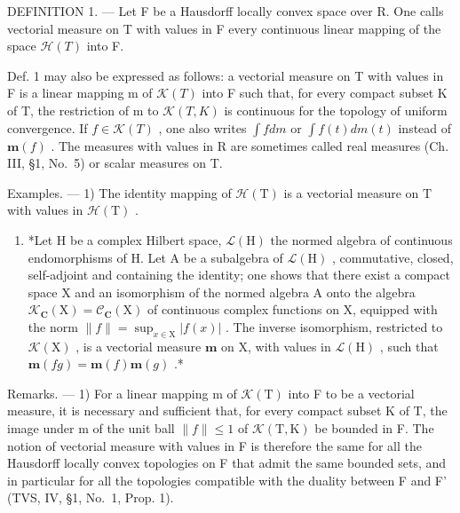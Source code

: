 DEFINITION 1. --- Let F be a Hausdorff locally convex space over R. One calls vectorial measure on T with values in F every continuous linear mapping of the space \(\mathcal{H}(T)\) into F.

Def. 1 may also be expressed as follows: a vectorial measure on T with values in F is a linear mapping m of \(\mathcal{K}(T)\) into F such that, for every compact subset K of T, the restriction of m to \(\mathcal{K}(T,K)\) is continuous for the topology of uniform convergence. If \(f \in \mathcal{K}(T)\) , one also writes \(\int f dm\) or \(\int f(t) dm(t)\) instead of \(\mathbf{m}(f)\) . The measures with values in R are sometimes called real measures (Ch. III, §1, No.~5) or scalar measures on T.

Examples. --- 1) The identity mapping of \(\mathcal{H}(\mathrm{T})\) is a vectorial measure on \(\mathrm{T}\) with values in \(\mathcal{H}(\mathrm{T})\) .

\begin{enumerate}
\def\labelenumi{\arabic{enumi})}
\setcounter{enumi}{1}
\tightlist
\item
  *Let H be a complex Hilbert space, \(\mathcal{L}(\mathrm{H})\) the normed algebra of continuous endomorphisms of H. Let A be a subalgebra of \(\mathcal{L}(\mathrm{H})\) , commutative, closed, self-adjoint and containing the identity; one shows that there exist a compact space X and an isomorphism of the normed algebra A onto the algebra \(\mathcal{K}_{\mathbf{C}}(\mathrm{X}) = \mathcal{C}_{\mathbf{C}}(\mathrm{X})\) of continuous complex functions on X, equipped with the norm \(\| f \| = \sup_{x \in \mathrm{X}} |f(x)|\) . The inverse isomorphism, restricted to \(\mathcal{K}(\mathrm{X})\) , is a vectorial measure \(\mathbf{m}\) on X, with values in \(\mathcal{L}(\mathrm{H})\) , such that \(\mathbf{m}(fg) = \mathbf{m}(f)\mathbf{m}(g)\) .*
\end{enumerate}

Remarks. --- 1) For a linear mapping m of \(\mathcal{K}(\mathrm{T})\) into F to be a vectorial measure, it is necessary and sufficient that, for every compact subset K of T, the image under m of the unit ball \(\|f\|\leqslant1\) of \(\mathcal{K}(\mathrm{T},\mathrm{K})\) be bounded in F. The notion of vectorial measure with values in F is therefore the same for all the Hausdorff locally convex topologies on F that admit the same bounded sets, and in particular for all the topologies compatible with the duality between F and F' (TVS, IV, §1, No.~1, Prop. 1).

